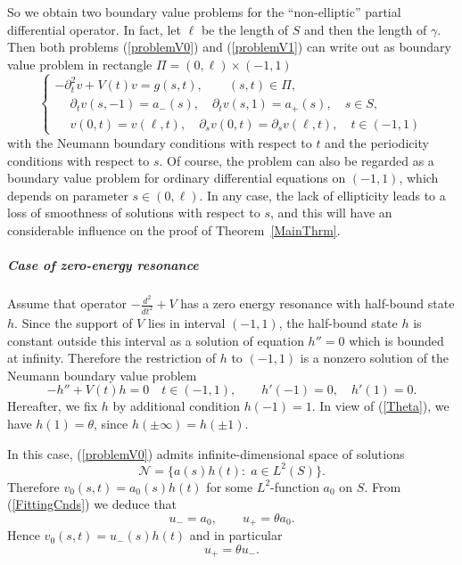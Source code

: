 \documentclass[graybox]{svmult}
\newcommand{\eqref}[1]{(\ref{#1})}
\newcommand{\pte}{\partial_t}
\begin{document}
So we obtain two boundary value problems for the ``non-ellip\-tic'' partial differential operator.
In fact, let $\ell$ be the length of $S$ and then the length of $\gamma$. Then both problems \eqref{problemV0} and  \eqref{problemV1} can write out as  boundary value problem in  rectangle $\Pi=(0,\ell)\times(-1,1)$
$$
\left\{
  \begin{array}{ll}
    -\pte^2 v+V(t)v=g(s,t), \qquad (s,t)\in \Pi, \\
    \phantom{-}\partial_t v(s,- 1)=a_-(s), \quad \partial_t v(s, 1)=a_+(s), \quad s\in S,\\
\phantom{-}v(0,t)=v(\ell,t), \quad \partial_s v(0,t)=\partial_s v(\ell,t), \quad t\in (-1,1)
  \end{array}
\right.
$$
with the Neumann boundary conditions with respect to $t$ and the periodicity conditions with respect to $s$.
Of course,  the problem can also be  regarded as a boundary value problem for ordinary differential equations on $(-1,1)$, which depends on parameter $s\in (0,\ell)$. In any case, the lack of ellipticity  leads to a loss of smoothness of solutions with respect to $s$, and this will have an considerable influence on the proof of Theorem~\ref{MainThrm}.







\subparagraph{Case of zero-energy resonance}
Assume that operator $-\frac{d^2}{dt^2}+V$ has a zero energy resonance with half-bound state $h$. Since the support of $V$ lies in  interval $(-1,1)$, the half-bound state $h$ is  constant  outside this interval as a solution of equation $h''=0$ which is bounded at infinity.
Therefore the restriction of $h$ to $(-1,1)$ is a nonzero solution of the Neumann boundary value problem
\begin{equation}\label{NeumanProblem}
     -h''+V(t)h= 0\quad t\in(-1,1),\qquad   h'(-1)=0, \quad h'(1)=0.
\end{equation}
Hereafter, we fix $h$ by additional condition $h(-1)=1$. In view of
\eqref{Theta}, we have $h(1)=\theta$, since $h(\pm\infty)=h(\pm 1)$.




In this case, \eqref{problemV0}  admits infinite-dimensional space of solutions
$$
\mathcal{N}=\big\{a(s)h(t)\colon \;a\in L^2(S)\big\}.
$$
Therefore $v_0(s,t)=a_0(s)h(t)$ for some $L^2$-function $a_0$ on $S$. From \eqref{FittingCnds} we deduce that
$$
   u_-=a_0, \qquad u_+=\theta a_0.
$$
Hence $v_0(s,t)=u_-(s)h(t)$ and  in particular
\begin{equation}\label{RCond0}
     u_+=\theta u_-.
\end{equation}
\end{document}
